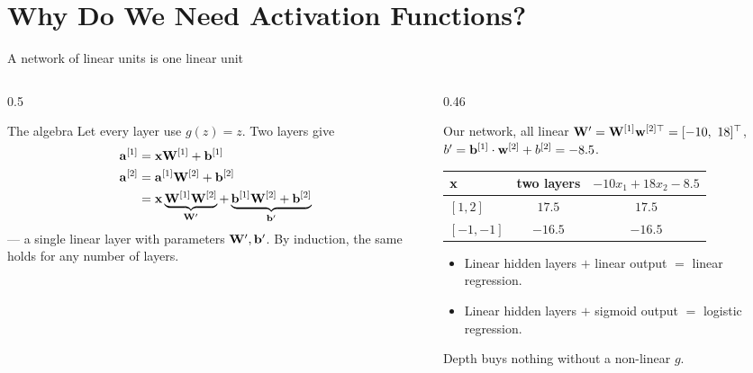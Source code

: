 \documentclass[aspectratio=169,10pt]{beamer}
\begin{document}
\section{Why Do We Need Activation Functions?}

\begin{frame}{A network of linear units is one linear unit}
  \begin{columns}[T,onlytextwidth]
    \begin{column}{0.5\textwidth}
      \begin{block}{The algebra}
        \footnotesize
        Let every layer use $g(z)=z$. Two layers give
        \begin{align*}
          \mathbf{a}^{[1]} &= \mathbf{x}\mathbf{W}^{[1]}+\mathbf{b}^{[1]}\\
          \mathbf{a}^{[2]} &= \mathbf{a}^{[1]}\mathbf{W}^{[2]}+\mathbf{b}^{[2]}\\
                    &= \mathbf{x}\underbrace{\mathbf{W}^{[1]}\mathbf{W}^{[2]}}_{\mathbf{W}'}
                       + \underbrace{\mathbf{b}^{[1]}\mathbf{W}^{[2]}+\mathbf{b}^{[2]}}_{\mathbf{b}'}
        \end{align*}
        --- a single linear layer with parameters $\mathbf{W}',\mathbf{b}'$. By induction, the
        same holds for any number of layers.
      \end{block}
    \end{column}
    \begin{column}{0.46\textwidth}
      \footnotesize
      \begin{block}{Our network, all linear}
        $\mW'=\mW^{[1]}\vw^{[2]\top}=[-10,\ 18]^{\top}$,\quad
        $b'=\mathbf{b}^{[1]}\cdot\mathbf{w}^{[2]}+b^{[2]}=-8.5$.\par
        \vspace{1mm}
        \renewcommand{\arraystretch}{1.15}
        \begin{tabular}{@{}lcc@{}}
          \toprule
          $\mathbf{x}$ & two layers & $-10x_1+18x_2-8.5$\\
          \midrule
          $[1,2]$   & $17.5$  & $17.5$\\
          $[-1,-1]$ & $-16.5$ & $-16.5$\\
          \bottomrule
        \end{tabular}
      \end{block}
      \begin{keyidea}[Consequences]
        \begin{itemize}
          \item Linear hidden layers $+$ linear output $=$ linear regression.
          \item Linear hidden layers $+$ sigmoid output $=$ logistic regression.
        \end{itemize}
        Depth buys nothing without a non-linear $g$.
      \end{keyidea}
    \end{column}
  \end{columns}
\end{frame}
\end{document}
